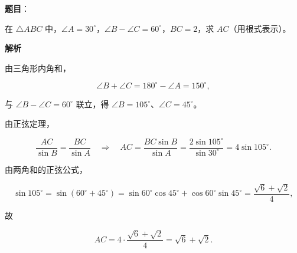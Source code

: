 \begin{answer}

\textbf{题目}：

在 $\triangle ABC$ 中，$\angle A=30^\circ$，$\angle B-\angle C=60^\circ$，$BC=2$，求 $AC$（用根式表示）。
\nopagebreak[4]
\begin{center}\end{center}
\nopagebreak[4]
\textbf{解析}

由三角形内角和，

\nopagebreak[4]
\[
\angle B+\angle C=180^\circ-\angle A=150^\circ,
\]

与 $\angle B-\angle C=60^\circ$ 联立，得 $\angle B=105^\circ$、$\angle C=45^\circ$。
\nopagebreak[4]
\begin{center}\end{center}
\nopagebreak[4]
由正弦定理，

\nopagebreak[4]
\[
\frac{AC}{\sin B}=\frac{BC}{\sin A}
\quad\Longrightarrow\quad
AC=\frac{BC\sin B}{\sin A}
=\frac{2\sin 105^\circ}{\sin 30^\circ}=4\sin 105^\circ.
\]

由两角和的正弦公式，

\nopagebreak[4]
\[
\sin 105^\circ=\sin(60^\circ+45^\circ)
=\sin 60^\circ\cos 45^\circ+\cos 60^\circ\sin 45^\circ
=\frac{\sqrt{6}+\sqrt{2}}{4},
\]

故

\nopagebreak[4]
\[
AC=4\cdot\frac{\sqrt{6}+\sqrt{2}}{4}=\sqrt{6}+\sqrt{2}.
\]


\end{answer}
